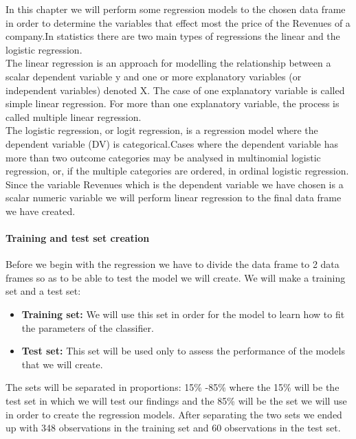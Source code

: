 \documentclass{article}
\begin{document}
In this chapter we will perform some regression models to the chosen data frame in order to determine the variables that effect most the price of the Revenues of a company.In statistics there are two main types of regressions the linear and the logistic regression.\\
The linear regression is an approach for modelling the relationship between a scalar dependent variable y and one or more explanatory variables (or independent variables) denoted X. The case of one explanatory variable is called simple linear regression. For more than one explanatory variable, the process is called multiple linear regression.\\
The logistic regression, or logit regression, is a regression model where the dependent variable (DV) is categorical.Cases where the dependent variable has more than two outcome categories may be analysed in multinomial logistic regression, or, if the multiple categories are ordered, in ordinal logistic regression.\\
Since the variable Revenues which is the dependent variable we have chosen is a scalar numeric variable we will perform linear regression to the final data frame we have created.
\paragraph{Training and test set creation}
Before we begin with the regression we have to divide the data frame to 2 data frames so as to be able to test the model we will create. We will make a training set and a test set:
\begin{itemize}
\item \textbf{Training set:} We will use this set in order for the model to learn how to fit the parameters of the classifier.
\item \textbf{Test set:} This set will be used only to assess the performance of the models that we will create.
\end{itemize}  
The sets will be separated in proportions: 15\% -85\% where the 15\% will be the test set in which we will test our findings and the 85\% will be the set we will use in order to create the regression models. After separating the two sets we ended up with 348 observations in the training set and 60 observations in the test set.
\end{document}

